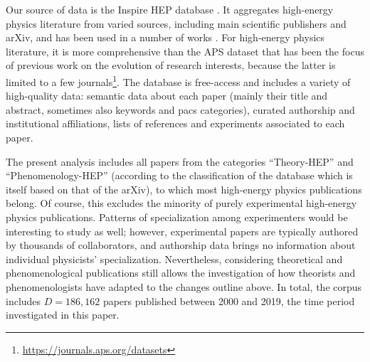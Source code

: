\documentclass{article}
\begin{document}
Our source of data is the Inspire HEP database \citep{InspireAPI}. It aggregates high-energy physics literature from varied sources, including main scientific publishers and arXiv, and has been used in a number of works \citep{Perovi2016,Chall2019a,Strumia2021,Sikimi2022,Gautheron2023}. For high-energy physics literature, it is more comprehensive than the APS dataset that has been the focus of previous work on the evolution of research interests, because the latter is limited to a few journals\footnote{\url{https://journals.aps.org/datasets}}. The database is free-access and includes a variety of high-quality data: semantic data about each paper (mainly their title and abstract, sometimes also keywords and \gls{pacs} categories), curated authorship and institutional affiliations, lists of references and experiments associated to each paper. %

The present analysis includes all papers from the categories ``Theory-HEP'' and ``Phenomenology-HEP'' (according to the classification of the database which is itself based on that of the arXiv), to which most  high-energy physics publications belong. Of course, this excludes the minority of purely experimental high-energy physics publications. Patterns of specialization among experimenters would be interesting to study as well; however, experimental papers are typically authored by thousands of collaborators, and authorship data brings no information about individual physicists' specialization. Nevertheless, considering theoretical and phenomenological publications still allows the investigation of how theorists and phenomenologists have adapted to the changes outline above. In total, the corpus includes $D=186,162$ papers published between 2000 and 2019, the time period investigated in this paper.
\end{document}
